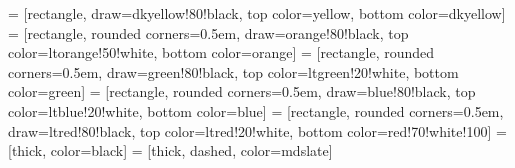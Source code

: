 
 = [rectangle, 
                      draw=dkyellow!80!black,
                      top color=yellow,
                      bottom color=dkyellow]
 = [rectangle, 
                      rounded corners=0.5em,
                      draw=orange!80!black,
                      top color=ltorange!50!white,
                      bottom color=orange]
 = [rectangle, 
                      rounded corners=0.5em,
                      draw=green!80!black,
                      top color=ltgreen!20!white,
                      bottom color=green]
 = [rectangle, 
                      rounded corners=0.5em,
                      draw=blue!80!black,
                      top color=ltblue!20!white,
                      bottom color=blue]
 = [rectangle, 
                      rounded corners=0.5em,
                      draw=ltred!80!black,
                      top color=ltred!20!white,
                      bottom color=red!70!white!100]
 = [thick, color=black]
 = [thick, dashed, color=mdslate]


